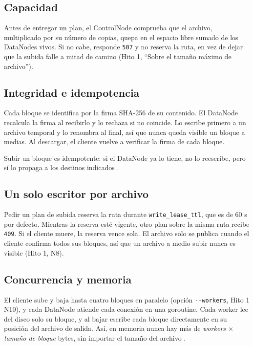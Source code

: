 \documentclass[10pt]{article}
\begin{document}
\subsection{Capacidad}

Antes de entregar un plan, el ControlNode comprueba que el archivo, multiplicado por su número de copias, quepa en el espacio libre sumado de los DataNodes vivos. Si no cabe, responde \texttt{507} y no reserva la ruta, en vez de dejar que la subida falle a mitad de camino (Hito 1, ``Sobre el tamaño máximo de archivo'').

\subsection{Integridad e idempotencia}

Cada bloque se identifica por la firma SHA-256 de su contenido. El DataNode recalcula la firma al recibirlo y lo rechaza si no coincide. Lo escribe primero a un archivo temporal y lo renombra al final, así que nunca queda visible un bloque a medias. Al descargar, el cliente vuelve a verificar la firma de cada bloque.

Subir un bloque es idempotente: si el DataNode ya lo tiene, no lo reescribe, pero sí lo propaga a los destinos indicados .

\subsection{Un solo escritor por archivo}

Pedir un plan de subida reserva la ruta durante \texttt{write\_lease\_ttl}, que es de 60 s por defecto. Mientras la reserva esté vigente, otro plan sobre la misma ruta recibe \texttt{409}. Si el cliente muere, la reserva vence sola. El archivo solo se publica cuando el cliente confirma todos sus bloques, así que un archivo a medio subir nunca es visible (Hito 1, N8).

\subsection{Concurrencia y memoria}

El cliente sube y baja hasta cuatro bloques en paralelo (opción \texttt{-{}-workers}, Hito 1 N10), y cada DataNode atiende cada conexión en una goroutine. Cada worker lee del disco solo su bloque, y al bajar escribe cada bloque directamente en su posición del archivo de salida. Así, en memoria nunca hay más de \emph{workers $\times$ tamaño de bloque} bytes, sin importar el tamaño del archivo .
\end{document}
